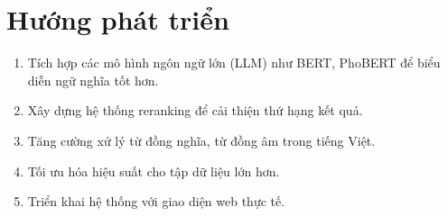 \documentclass[../BTL.tex]{subfiles}
\begin{document}
\section{Hướng phát triển}
\begin{enumerate}
    \item Tích hợp các mô hình ngôn ngữ lớn (LLM) như BERT, PhoBERT để biểu diễn ngữ nghĩa tốt hơn.
    \item Xây dựng hệ thống reranking để cải thiện thứ hạng kết quả.
    \item Tăng cường xử lý từ đồng nghĩa, từ đồng âm trong tiếng Việt.
    \item Tối ưu hóa hiệu suất cho tập dữ liệu lớn hơn.
    \item Triển khai hệ thống với giao diện web thực tế.
\end{enumerate}
\end{document}
